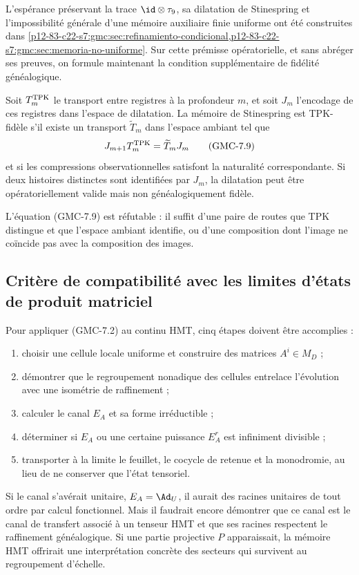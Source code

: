 L'espérance préservant la trace \(\id\otimes\tau_9\), sa dilatation de
Stinespring et l'impossibilité générale d'une mémoire auxiliaire finie
uniforme ont été construites dans
\cref{p12-83-c22-s7:gmc:sec:refinamiento-condicional,p12-83-c22-s7:gmc:sec:memoria-no-uniforme}. Sur
cette prémisse opératorielle, et sans abréger ses preuves, on formule maintenant la
condition supplémentaire de fidélité généalogique.

Soit $T_m^{\rm TPK}$ le transport entre registres à la profondeur $m$, et soit
$J_m$ l'encodage de ces registres dans l'espace de dilatation. La
mémoire de Stinespring est TPK-fidèle s'il existe un transport
$\widetilde T_m$ dans l'espace ambiant tel que
\[
 J_{m+1}T_m^{\rm TPK}=\widetilde T_mJ_m
 \tag{GMC-7.9}
\]
et si les compressions observationnelles satisfont la naturalité correspondante.
Si deux histoires distinctes sont identifiées par $J_m$, la dilatation peut être
opératoriellement valide mais non généalogiquement fidèle.

L'équation \textup{(GMC-7.9)} est réfutable : il suffit d'une paire de routes que TPK
distingue et que l'espace ambiant identifie, ou d'une composition dont l'image ne coïncide pas
avec la composition des images.

\subsection{Critère de compatibilité avec les limites d'états de produit matriciel}

Pour appliquer \textup{(GMC-7.2)} au continu HMT, cinq étapes doivent être accomplies :

\begin{enumerate}
 \item choisir une cellule locale uniforme et construire des matrices
 $A^i\in M_D$ ;
 \item démontrer que le regroupement nonadique des cellules entrelace l'évolution
 avec une isométrie de raffinement ;
 \item calculer le canal $E_A$ et sa forme irréductible ;
 \item déterminer si $E_A$ ou une certaine puissance $E_A^r$ est infiniment
 divisible ;
 \item transporter à la limite le feuillet, le cocycle de retenue et la
 monodromie, au lieu de ne conserver que l'état tensoriel.
\end{enumerate}

Si le canal s'avérait unitaire, $E_A=\Ad_U$, il aurait des racines unitaires de tout
ordre par calcul fonctionnel. Mais il faudrait encore démontrer que ce canal est
le canal de transfert associé à un tenseur HMT et que ses racines respectent le raffinement
généalogique. Si une partie projective $P$ apparaissait, la mémoire HMT offrirait
une interprétation concrète des secteurs qui survivent au regroupement
d'échelle.

